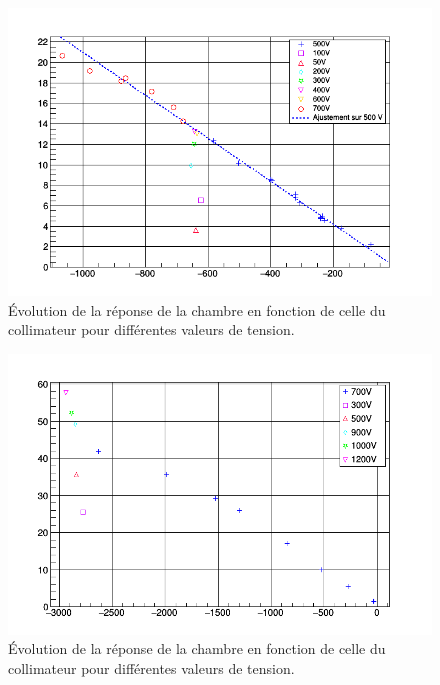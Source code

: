 \documentclass[a4paper,11pt]{article}
\begin{document}
\begin{figure}[h]
\begin{center}
\includegraphics[width=\linewidth]{chambre_vs_colli.png} 
\caption{\label{fig:chambrevscolli}\footnotesize{Évolution de la réponse de la chambre en fonction de celle du collimateur pour différentes valeurs de tension.}}
\end{center}
\end{figure}

\begin{figure}[h]
\begin{center}
\includegraphics[width=\linewidth]{chambre_vs_colli2.png} 
\caption{\label{fig:chambrevscolli}\footnotesize{Évolution de la réponse de la chambre en fonction de celle du collimateur pour différentes valeurs de tension.}}
\end{center}
\end{figure}

\end{document}
